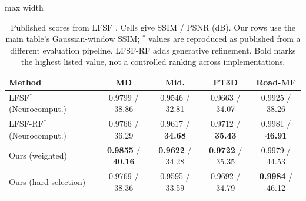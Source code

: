 \begin{table}[htbp]
\centering
\footnotesize
\setlength{\tabcolsep}{2.7pt}
\caption{Published scores from LFSF \cite{li2026lfsf}. Cells give SSIM / PSNR (dB). Our rows use the main table's Gaussian-window SSIM; $^\ast$ values are reproduced as published from a different evaluation pipeline. LFSF-RF adds generative refinement. Bold marks the highest listed value, not a controlled ranking across implementations.}
\label{tab:lfsf}
\begin{adjustbox}{max width=\textwidth}
\begin{tabular}{lcccc}
\toprule
Method & MD & Mid. & FT3D & Road-MF \\
\midrule
LFSF$^\ast$ (Neurocomput.)~\cite{li2026lfsf} & 0.9799 / 38.86 & 0.9546 / 32.81 & 0.9663 / 34.07 & 0.9925 / 38.26 \\
LFSF-RF$^\ast$ (Neurocomput.)~\cite{li2026lfsf} & 0.9766 / 36.29 & 0.9617 / \textbf{34.68} & 0.9712 / \textbf{35.43} & 0.9981 / \textbf{46.91} \\
Ours (weighted) & \textbf{0.9855} / \textbf{40.16} & \textbf{0.9622} / 34.28 & \textbf{0.9722} / 35.35 & 0.9979 / 44.53 \\
Ours (hard selection) & 0.9769 / 38.36 & 0.9595 / 33.59 & 0.9692 / 34.79 & \textbf{0.9984} / 46.12 \\
\bottomrule
\end{tabular}
\end{adjustbox}
\end{table}

